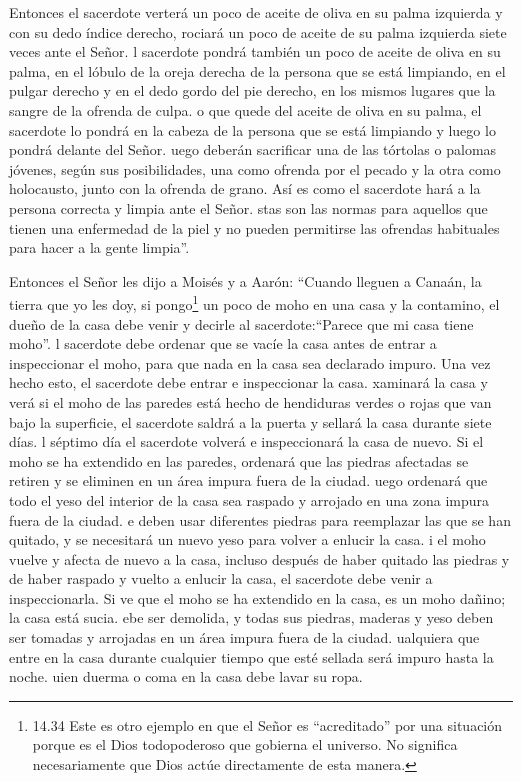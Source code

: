  Entonces el sacerdote verterá un poco de aceite de oliva
en su palma izquierda  y con su dedo índice derecho,
rociará un poco de aceite de su palma izquierda siete veces ante el
Señor.  l sacerdote pondrá también un poco de aceite de
oliva en su palma, en el lóbulo de la oreja derecha de la persona que se
está limpiando, en el pulgar derecho y en el dedo gordo del pie derecho,
en los mismos lugares que la sangre de la ofrenda de culpa.
 o que quede del aceite de oliva en su palma, el sacerdote
lo pondrá en la cabeza de la persona que se está limpiando y luego lo
pondrá delante del Señor.  uego deberán sacrificar una de
las tórtolas o palomas jóvenes, según sus posibilidades, 
una como ofrenda por el pecado y la otra como holocausto, junto con la
ofrenda de grano. Así es como el sacerdote hará a la persona correcta y
limpia ante el Señor.  stas son las normas para aquellos
que tienen una enfermedad de la piel y no pueden permitirse las ofrendas
habituales para hacer a la gente limpia''.

 Entonces el Señor les dijo a Moisés y a Aarón:
 ``Cuando lleguen a Canaán, la tierra que yo les doy, si
pongo\footnote{14.34 Este es otro ejemplo en que el Señor es
  ``acreditado'' por una situación porque es el Dios todopoderoso que
  gobierna el universo. No significa necesariamente que Dios actúe
  directamente de esta manera.} un poco de moho en una casa y la
contamino,  el dueño de la casa debe venir y decirle al
sacerdote:``Parece que mi casa tiene moho''.  l sacerdote
debe ordenar que se vacíe la casa antes de entrar a inspeccionar el
moho, para que nada en la casa sea declarado impuro. Una vez hecho esto,
el sacerdote debe entrar e inspeccionar la casa.  xaminará
la casa y verá si el moho de las paredes está hecho de hendiduras verdes
o rojas que van bajo la superficie,  el sacerdote saldrá a
la puerta y sellará la casa durante siete días.  l séptimo
día el sacerdote volverá e inspeccionará la casa de nuevo. Si el moho se
ha extendido en las paredes,  ordenará que las piedras
afectadas se retiren y se eliminen en un área impura fuera de la ciudad.
 uego ordenará que todo el yeso del interior de la casa sea
raspado y arrojado en una zona impura fuera de la ciudad. 
e deben usar diferentes piedras para reemplazar las que se han quitado,
y se necesitará un nuevo yeso para volver a enlucir la casa.
 i el moho vuelve y afecta de nuevo a la casa, incluso
después de haber quitado las piedras y de haber raspado y vuelto a
enlucir la casa,  el sacerdote debe venir a inspeccionarla.
Si ve que el moho se ha extendido en la casa, es un moho dañino; la casa
está sucia.  ebe ser demolida, y todas sus piedras, maderas
y yeso deben ser tomadas y arrojadas en un área impura fuera de la
ciudad.  ualquiera que entre en la casa durante cualquier
tiempo que esté sellada será impuro hasta la noche.  uien
duerma o coma en la casa debe lavar su ropa.

